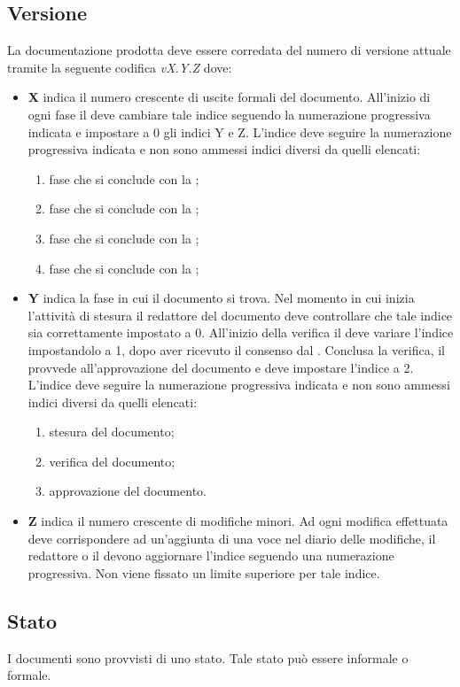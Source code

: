 \documentclass[12pt,a4paper]{article}
\begin{document}
\subsection{Versione} \label{Versione}
La documentazione prodotta deve essere corredata del numero di versione attuale tramite la seguente codifica \emph{vX.Y.Z} dove:
\begin{itemize}
	\item \textbf{X} indica il numero crescente di uscite formali del documento. All'inizio di ogni fase il \PM deve cambiare tale indice seguendo la numerazione progressiva indicata e impostare a 0 gli indici Y e Z. L'indice deve seguire la numerazione progressiva indicata e non sono ammessi indici diversi da quelli elencati:
	\begin{enumerate}
		\item fase che si conclude con la \RR;
		\item fase che si conclude con la \RP;
		\item fase che si conclude con la \RQ;
		\item fase che si conclude con la \RA;
	\end{enumerate}
	\item \textbf{Y} indica la fase in cui il documento si trova. Nel momento in cui inizia l'attività di stesura il redattore del documento deve controllare che tale indice sia correttamente impostato a 0. All'inizio della verifica il \VR{} deve variare l'indice impostandolo a 1, dopo aver ricevuto il consenso dal \PM. Conclusa la verifica, il \PM{} provvede all'approvazione del documento e deve impostare l'indice a 2. L'indice deve seguire la numerazione progressiva indicata e non sono ammessi indici diversi da quelli elencati:
	\begin{enumerate}[start=0]
		\item stesura del documento;
		\item verifica del documento;
		\item approvazione del documento.
	\end{enumerate}
	\item \textbf{Z} indica il numero crescente di modifiche minori. Ad ogni modifica effettuata deve corrispondere ad un'aggiunta di una voce nel diario delle modifiche, il redattore o il \VR devono aggiornare l'indice seguendo una numerazione progressiva. Non viene fissato un limite superiore per tale indice.
\end{itemize}

\subsection{Stato}
I documenti sono provvisti di uno stato. Tale stato può essere informale o formale.
\end{document}

